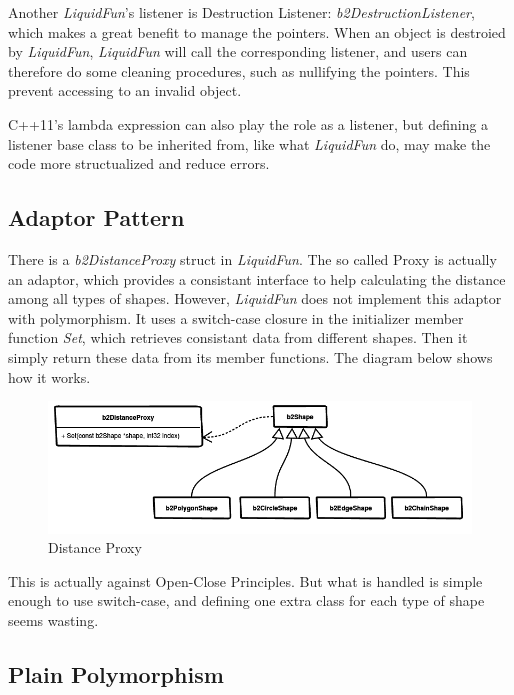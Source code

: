 \documentclass[UTF8]{ctexart}
\begin{document}
            Another \textit{LiquidFun}'s listener is Destruction Listener: \textit{b2DestructionListener}, which makes a great benefit to manage the pointers. When an object is destroied by \textit{LiquidFun}, \textit{LiquidFun} will call the corresponding listener, and users can therefore do some cleaning procedures, such as nullifying the pointers. This prevent accessing to an invalid object.

            C++11's lambda expression can also play the role as a listener, but defining a listener base class to be inherited from, like what \textit{LiquidFun} do, may make the code more structualized and reduce errors.

        \subsection{Adaptor Pattern}
        
            There is a \textit{b2DistanceProxy} struct in \textit{LiquidFun}. The so called Proxy is actually an adaptor, which provides a consistant interface to help calculating the distance among all types of shapes. However, \textit{LiquidFun} does not implement this adaptor with polymorphism. It uses a switch-case closure in the initializer member function \textit{Set}, which retrieves consistant data from different shapes. Then it simply return these data from its member functions. The diagram below shows how it works.

            \begin{figure}[ht]
                \centering
                \includegraphics[width=\textwidth]{distance_proxy.png}
                \caption{Distance Proxy}
            \end{figure}

            This is actually against Open-Close Principles. But what is handled is simple enough to use switch-case, and defining one extra class for each type of shape seems wasting.

        \subsection{Plain Polymorphism}
\end{document}
